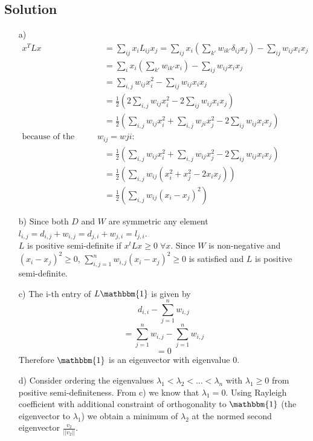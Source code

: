 \documentclass[10pt]{article}
\numberwithin{equation}{section}
\begin{document}
\subsection*{Solution}
\begin{enumerate}
  \item[a)]{
\begin{align*}
	x^T Lx &= \sum_{ij} x_i L_{ij} x_j = \sum_{ij} x_i\left(\sum_{k'}w_{ik'} \delta_{ij} x_j\right) - \sum_{ij} w_{ij}x_i x_j \\
	&= \sum_{i} x_i\left(\sum_{k'}w_{ik'} x_i\right) - \sum_{ij} w_{ij}x_i x_j \\
  &= \sum_{i, j} w_{ij} x_i^2 - \sum_{ij} w_{ij}x_i x_j  \\
	&= \frac{1}{2} \left( 2 \sum_{i, j} w_{ij} x_i^2 - 2\sum_{ij} w_{ij}x_i x_j\right) \\
	&= \frac{1}{2} \left(  \sum_{i, j} w_{ij} x_i^2 + \sum_{i, j} w_{ji} x_j^2 - 2\sum_{ij}w_{ij}x_i x_j\right) \\
\text{because of the symmetry of W} w_{ij} = w{ji}:\\
	&= \frac{1}{2} \left(  \sum_{i, j} w_{ij} x_i^2 + \sum_{i, j} w_{ij} x_j^2 - 2\sum_{ij}w_{ij}x_i x_j\right)\\
	&= \frac{1}{2} \left(  \sum_{i, j} w_{ij} (x_i^2 +  x_j^2 - 2 x_i x_j)\right)\\
	&=\frac{1}{2} \left(  \sum_{i, j} w_{ij} (x_i-x_j)^2\right)
\end{align*} 
    }
  \item[b)]{
      Since both $D$ and $W$ are symmetric any element $l_{i,j} = d_{i,j} + w_{i,j} = d_{j,i} + w_{j,i} = l_{j,i}$.\\ $L$ is positive semi-definite if $x^t Lx \geq 0 \; \forall x$. Since $W$ is non-negative and $(x_i - x_j)^2 \geq 0$, $\sum_{i,j=1}^n w_{i,j} (x_i - x_j)^2 \geq 0$ is satisfied and $L$ is positive semi-definite.
    }
  \item[c)]{
      The i-th entry of $L \mathbbm{1}$ is given by
      $$d_{i,i} - \sum_{j=1}^n w_{i,j}$$
      $$= \sum_{j=1}^n w_{i,j}- \sum_{j=1}^n w_{i,j}$$
      $$=0$$
      Therefore $\mathbbm{1}$ is an eigenvector with eigenvalue $0$.
    }
  \item[d)]{
      Consider ordering the eigenvalues $\lambda_1 < \lambda_2 < \dots < \lambda_n$ with $\lambda_1 \geq 0$ from positive semi-definiteness. From c) we know that $\lambda_1 = 0$. Using Rayleigh coefficient with additional constraint of orthogonality to $\mathbbm{1}$ (the eigenvector to $\lambda_1$) we obtain a minimum of $\lambda_2$ at the normed second eigenvector $\frac{v_2}{||v_2||}$.
    }
\end{enumerate}
\end{document}
